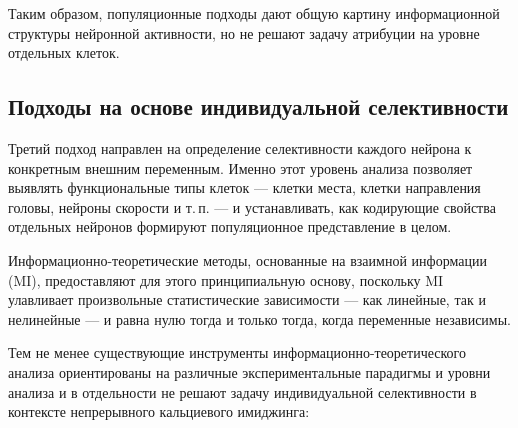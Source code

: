 Таким образом, популяционные подходы дают общую картину информационной структуры нейронной активности, но не решают задачу атрибуции на уровне отдельных клеток.


\subsection{Подходы на основе индивидуальной селективности}
\label{sec:selectivity_approaches}

Третий подход направлен на определение селективности каждого нейрона к конкретным внешним переменным.
Именно этот уровень анализа позволяет выявлять функциональные типы клеток --- клетки места, клетки направления головы, нейроны скорости и т.\,п. --- и устанавливать, как кодирующие свойства отдельных нейронов формируют популяционное представление в целом.

Информационно-теоретические методы, основанные на взаимной информации (MI), предоставляют для этого принципиальную основу, поскольку MI улавливает произвольные статистические зависимости --- как линейные, так и нелинейные --- и равна нулю тогда и только тогда, когда переменные независимы.

Тем не менее существующие инструменты информационно-теоретического анализа ориентированы на различные экспериментальные парадигмы и уровни анализа и в отдельности не решают задачу индивидуальной селективности в контексте непрерывного кальциевого имиджинга:

